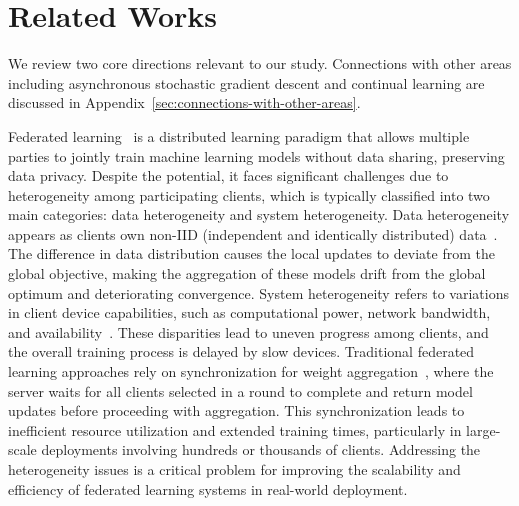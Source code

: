\section{Related Works}
We review two core directions relevant to our study. Connections with other areas including asynchronous stochastic gradient descent and continual learning are discussed in Appendix~\ref{sec:connections-with-other-areas}.

Federated learning~\cite{mcmahan2017communication} is a distributed learning paradigm that allows multiple parties to jointly train machine learning models without data sharing, preserving data privacy. Despite the potential, it faces significant challenges due to heterogeneity among participating clients, which is typically classified into two main categories: data heterogeneity and system heterogeneity. Data heterogeneity appears as clients own non-IID (independent and identically distributed) data~\cite{li2020federated,karimireddy2020scaffold,wang2020tackling,zhang2023navigating}. The difference in data distribution causes the local updates to deviate from the global objective, making the aggregation of these models drift from the global optimum and deteriorating convergence. System heterogeneity refers to variations in client device capabilities, such as computational power, network bandwidth, and availability~\cite{wang2020tackling,zhang2021parameterized,li2021fedmask,fang2022robust,alam2022fedrolex,zhang2024few}. These disparities lead to uneven progress among clients, and the overall training process is delayed by slow devices. Traditional federated learning approaches rely on synchronization for weight aggregation~\cite{mcmahan2017communication,li2020federated,reddi2020adaptive}, where the server waits for all clients selected in a round to complete and return model updates before proceeding with aggregation. This synchronization leads to inefficient resource utilization and extended training times, particularly in large-scale deployments involving hundreds or thousands of clients. Addressing the heterogeneity issues is a critical problem for improving the scalability and efficiency of federated learning systems in real-world deployment.

